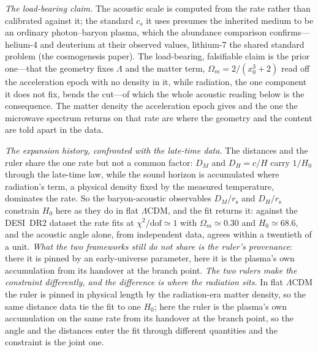 \documentclass[11pt,a4paper]{article}
\theoremstyle{plain}
\theoremstyle{definition}
\theoremstyle{remark}
\newcommand{\rs}{r_{\mathrm{s}}}
\begin{document}
\emph{The load-bearing claim.} The acoustic scale is computed from the rate rather than calibrated against it; the standard $c_s$ it uses presumes the inherited medium to be an ordinary photon--baryon plasma, which the abundance comparison confirms---helium-4 and deuterium at their observed values, lithium-7 the shared standard problem (the cosmogenesis paper). The load-bearing, falsifiable claim is the prior one---that the geometry fixes $\Lambda$ and the matter term, $\Omega_m=2/(x_0^{3}+2)$ read off the acceleration epoch with no density in it, while radiation, the one component it does not fix, bends the cut---of which the whole acoustic reading below is the consequence. The matter density the acceleration epoch gives and the one the microwave spectrum returns on that rate are where the geometry and the content are told apart in the data.

\emph{The expansion history, confronted with the late-time data.} The distances and the ruler share the one rate but not a common factor: $D_M$ and $D_H=c/H$ carry $1/H_0$ through the late-time law, while the sound horizon is accumulated where radiation's term, a physical density fixed by the measured temperature, dominates the rate. So the baryon-acoustic observables $D_M/\rs$ and $D_H/\rs$ constrain $H_0$ here as they do in flat $\Lambda$CDM, and the fit returns it: against the DESI~DR2 dataset the rate fits at $\chi^{2}/\mathrm{dof}\simeq1$ with $\Omega_m\simeq0.30$ and $H_0\simeq68.6$, and the acoustic angle alone, from independent data, agrees within a twentieth of a unit. \emph{What the two frameworks still do not share is the ruler's provenance}: there it is pinned by an early-universe parameter, here it is the plasma's own accumulation from its handover at the branch point.
\emph{The two rulers make the constraint differently, and the difference is where the radiation sits.} In
flat $\Lambda$CDM the ruler is pinned in physical length by the radiation-era matter density, so the same
distance data tie the fit to one $H_0$; here the ruler is the plasma's own accumulation on the same rate from
its handover at the branch point, so the angle and the distances enter the fit through different quantities and the constraint
is the joint one.
\end{document}
